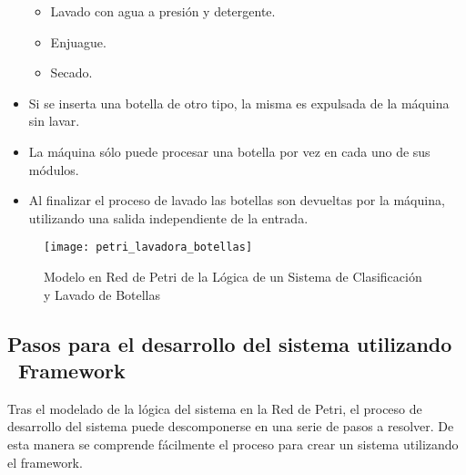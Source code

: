 \begin{itemize}
\begin{itemize}
        \item Lavado con agua a presión y detergente.
        \item Enjuague.
        \item Secado.
      \end{itemize}
  \item Si se inserta una botella de otro tipo, la misma es expulsada de la
    máquina sin lavar.
  \item La máquina sólo puede procesar una botella por vez en cada uno de sus
  módulos.
  \item Al finalizar el proceso de lavado las botellas son devueltas por la
  máquina, utilizando una salida independiente de la entrada.
  
\end{itemize}

\begin{figure}[H]
    \centering
    \texttt{[image: petri\_lavadora\_botellas]}
    \caption{Modelo en Red de Petri de la Lógica de un Sistema de Clasificación y
    Lavado de Botellas}
    \label{fig:petri_lavadora_botellas}
\end{figure}

\subsection {Pasos para el desarrollo del sistema utilizando  \\
\nombreFramework \  Framework}
\label{sec:pasos_desarrollo_lavadora_botellas}
Tras el modelado de la lógica del sistema en la Red de Petri, el
proceso de desarrollo del sistema puede descomponerse en una serie de
pasos a resolver.
De esta manera se comprende fácilmente el proceso para crear un sistema
utilizando el framework.

